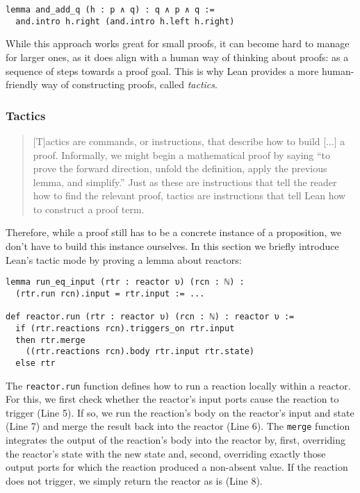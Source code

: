 \begin{lstlisting}
lemma and_add_q (h : p ∧ q) : q ∧ p ∧ q :=
  and.intro h.right (and.intro h.left h.right)
\end{lstlisting}

\noindent While this approach works great for small proofs, it can become hard to manage for larger ones, as it does align with a human way of thinking about proofs: as a sequence of steps towards a proof goal.
This is why Lean provides a more human-friendly way of constructing proofs, called \emph{tactics}.

\subsubsection{Tactics}

\begin{quote}
[T]actics are commands, or instructions, that describe how to build [...] a proof. 
Informally, we might begin a mathematical proof by saying ``to prove the forward direction, unfold the definition, apply the previous lemma, and simplify.'' 
Just as these are instructions that tell the reader how to find the relevant proof, tactics are instructions that tell Lean how to construct a proof term.\hfill \cite{leanbook}
\end{quote}
    
\noindent Therefore, while a proof still has to be a concrete instance of a proposition, we don't have to build this instance ourselves.
In this section we briefly introduce Lean's tactic mode by proving a lemma about reactors:

\lstset{numbers=left, xleftmargin=1.5em}
\begin{lstlisting}
lemma run_eq_input (rtr : reactor υ) (rcn : ℕ) : 
  (rtr.run rcn).input = rtr.input := ...

def reactor.run (rtr : reactor υ) (rcn : ℕ) : reactor υ :=
  if (rtr.reactions rcn).triggers_on rtr.input 
  then rtr.merge 
    ((rtr.reactions rcn).body rtr.input rtr.state)
  else rtr
\end{lstlisting}

\noindent The \lstinline{reactor.run} function defines how to run a reaction locally within a reactor.
For this, we first check whether the reactor's input ports cause the reaction to trigger (Line 5).
If so, we run the reaction's body on the reactor's input and state (Line 7) and merge the result back into the reactor (Line 6).
The \lstinline{merge} function integrates the output of the reaction's body into the reactor by, first, overriding the reactor's state with the new state and, second, overriding exactly those output ports for which the reaction produced a non-absent value.
If the reaction does not trigger, we simply return the reactor as is (Line 8).

